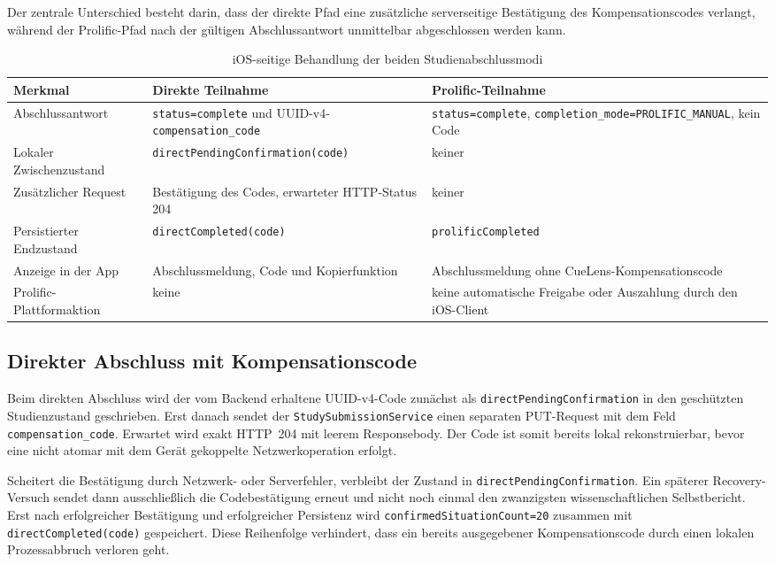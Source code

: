 \begin{neu}
Der zentrale Unterschied besteht darin, dass der direkte Pfad eine zusätzliche serverseitige Bestätigung des Kompensationscodes verlangt, während der Prolific-Pfad nach der gültigen Abschlussantwort unmittelbar abgeschlossen werden kann.

\begin{table}[htbp]
\centering
\caption{iOS-seitige Behandlung der beiden Studienabschlussmodi}
\label{tab:ios-completion-modes}
\begin{tabular}{p{}p{}p{}}
\textbf{Merkmal} & \textbf{Direkte Teilnahme} & \textbf{Prolific-Teilnahme} \\
\hline
Abschlussantwort & \texttt{status=complete} und UUID-v4-\texttt{compensation\_code} & \texttt{status=complete}, \texttt{completion\_mode=PROLIFIC\_MANUAL}, kein Code \\
Lokaler Zwischenzustand & \texttt{directPendingConfirmation(code)} & keiner \\
Zusätzlicher Request & Bestätigung des Codes, erwarteter HTTP-Status 204 & keiner \\
Persistierter Endzustand & \texttt{directCompleted(code)} & \texttt{prolificCompleted} \\
Anzeige in der App & Abschlussmeldung, Code und Kopierfunktion & Abschlussmeldung ohne CueLens-Kompensationscode \\
Prolific-Plattformaktion & keine & keine automatische Freigabe oder Auszahlung durch den iOS-Client \\
\end{tabular}
\end{table}

\subsection{Direkter Abschluss mit Kompensationscode}

Beim direkten Abschluss wird der vom Backend erhaltene UUID-v4-Code zunächst als \texttt{directPendingConfirmation} in den geschützten Studienzustand geschrieben. Erst danach sendet der \texttt{StudySubmissionService} einen separaten PUT-Request mit dem Feld \texttt{compensation\_code}. Erwartet wird exakt HTTP~204 mit leerem Responsebody. Der Code ist somit bereits lokal rekonstruierbar, bevor eine nicht atomar mit dem Gerät gekoppelte Netzwerkoperation erfolgt.

Scheitert die Bestätigung durch Netzwerk- oder Serverfehler, verbleibt der Zustand in \texttt{directPendingConfirmation}. Ein späterer Recovery-Versuch sendet dann ausschließlich die Codebestätigung erneut und nicht noch einmal den zwanzigsten wissenschaftlichen Selbstbericht. Erst nach erfolgreicher Bestätigung und erfolgreicher Persistenz wird \texttt{confirmedSituationCount=20} zusammen mit \texttt{directCompleted(code)} gespeichert. Diese Reihenfolge verhindert, dass ein bereits ausgegebener Kompensationscode durch einen lokalen Prozessabbruch verloren geht.


\end{neu}
